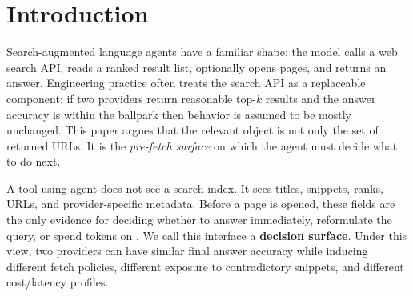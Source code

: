 \begin{abstract}
Search APIs have become essential in language-model agents and market is increasingly seeing many Search API offerings. Search-augmented language-model agents are often built as if commercial search APIs were interchangeable retrieval backends and while considering a replacement the go to measurement has been  answer accuracy.  We test that assumption by freezing the answer model, prompt, tools, iteration budget, and page-fetch backend, then swapping only the search provider. On \NQueries{} hard web-search questions from \textsc{SealQA-Hard}, Brave, Tavily, and Firecrawl produce nearly indistinguishable exact-match accuracy: \BraveEM{}, \TavilyEM{}, and \FirecrawlEM{} out of 100. We show that this apparent equivalence hides large differences in the agent's internal retrieval economy. We introduce a per-URL oracle that labels every URL visible to the agent--fetched or not--and analyze search APIs as \emph{decision surfaces}: ranked snippets and URLs that determine whether the agent answers, searches again, or spends fetch tokens. The same agent sees gold-supporting evidence on \BraveSupportVisibleQ{}, \TavilySupportVisibleQ{}, and \FirecrawlSupportVisibleQ{} queries across the three providers; its decision partition shifts from rich-snippet reading, to rank-one exploitation, to broad blind exploration. A surface-only contamination metric, the contradict-to-gold URL ratio, varies from \BraveContraRatio{} to \FirecrawlContraRatio{} without using the model's answer. Provider choice is therefore a retrieval-budget choice, not only a recall choice.
\end{abstract}

\section{Introduction}

Search-augmented language agents have a familiar shape: the model calls a web search API, reads a ranked result list, optionally opens pages, and returns an answer. Engineering practice often treats the search API as a replaceable component: if two providers return reasonable top-$k$ results and the answer accuracy is within the ballpark then behavior is assumed to be mostly unchanged. This paper argues that the relevant object is not only the set of returned URLs. It is the \emph{pre-fetch surface} on which the agent must decide what to do next.

A tool-using agent does not see a search index. It sees titles, snippets, ranks, URLs, and provider-specific metadata. Before a page is opened, these fields are the only evidence for deciding whether to answer immediately, reformulate the query, or spend tokens on \fetchPage{}. We call this interface a \textbf{decision surface}. Under this view, two providers can have similar final answer accuracy while inducing different fetch policies, different exposure to contradictory snippets, and different cost/latency profiles.


